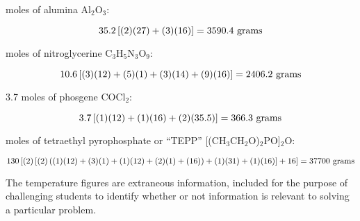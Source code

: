 





 moles of alumina Al$_{2}$O$_{3}$:

$$35.2 \left[(2)(27) + (3)(16) \right] = 3590.4 \hbox{ grams}$$

\vskip 10pt

 moles of nitroglycerine C$_{3}$H$_{5}$N$_{3}$O$_{9}$: 

$$10.6 \left[(3)(12) + (5)(1) + (3)(14) + (9)(16) \right] = 2406.2 \hbox{ grams}$$

\vskip 10pt

\noindent
\item{} 3.7 moles of phosgene COCl$_{2}$: 

$$3.7 \left[(1)(12) + (1)(16) + (2)(35.5) \right] = 366.3 \hbox{ grams}$$

\vskip 10pt

 moles of tetraethyl pyrophosphate or ``TEPP'' [(CH$_{3}$CH$_{2}$O)$_{2}$PO]$_{2}$O: 

$$130 \left[ (2) \left[ (2) \left((1)(12) + (3)(1) + (1)(12) + (2)(1) + (16) \right) + (1)(31) + (1)(16) \right] + 16 \right] = 37700 \hbox{ grams}$$

\vskip 10pt

The temperature figures are extraneous information, included for the purpose of challenging students to identify whether or not information is relevant to solving a particular problem.




